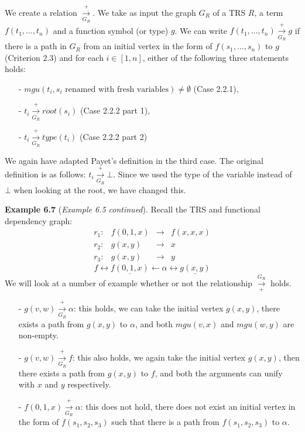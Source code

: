 \begin{definition}
\label{def:arrowrelation}
We create a relation $\xrightarrow[G_R]{+}$. We take as input the graph $G_R$ of a TRS $R$, a term $f(t_1, \dots, t_n)$ and a function symbol (or type) $g$. We can write $f(t_1, \dots, t_n) \xrightarrow[G_R]{+} g$ if there is a path in $G_R$ from an initial vertex in the form of $f(s_1, \dots, s_n)$ to $g$ (Criterion 2.3) and for each $i \in [1, n]$, either of the following three statements holds:
\begin{itemize}
    \itemsep -0.2em
    \item[-] $\textit{mgu}(t_i, s_i \text{ renamed with fresh variables}) \neq \emptyset$ (Case 2.2.1),
    \item[-] $t_i \xrightarrow[G_R]{+} \textit{root}(s_i)$ (Case 2.2.2 part 1),
    \item[-] $t_i \xrightarrow[G_R]{+} \textit{type}(t_i)$ (Case 2.2.2 part 2)
\end{itemize}
\end{definition}

We again have adapted Payet's definition in the third case. The original definition is as follows: $t_i \xrightarrow[G_R]{+} \bot$. Since we used the type of the variable instead of $\bot$ when looking at the root, we have changed this.

\textbf{Example 6.7} (\textit{Example 6.5 continued}). Recall the TRS and functional dependency graph:
\[
\begin{array}{lrcl}
    r_1: & f(0, 1, x) & \rightarrow & f(x, x, x) \\
    r_2: & g(x, y) & \rightarrow & x \\
    r_3: & g(x, y) & \rightarrow & y
\end{array}
\]
\[
f \longleftrightarrow \underline{f(0, 1, x)} \longleftarrow \alpha \longleftrightarrow \underline{g(x,y)}
\]
We will look at a number of example whether or not the relationship $\xrightarrow[+]{G_R}$ holds. 
\begin{itemize}
    \itemsep 0em
    \item[-] $g(v, w) \xrightarrow[G_R]{+} \alpha$: this holds, we can take the initial vertex $g(x, y)$, there exists a path from $g(x, y)$ to $\alpha$, and both $\textit{mgu}(v, x)$ and $\textit{mgu}(w, y)$ are non-empty. 
    \item[-] $g(v, w) \xrightarrow[G_R]{+} f$: this also holds, we again take the initial vertex $g(x, y)$, then there exists a path from $g(x, y)$ to $f$, and both the arguments can unify with $x$ and $y$ respectively. 
    \item[-] $f(0, 1, x) \xrightarrow[G_R]{+} \alpha$: this does not hold, there does not exist an initial vertex in the form of $f(s_1, s_2, s_3)$ such that there is a path from $f(s_1, s_2, s_3)$ to $\alpha$.
\end{itemize}

